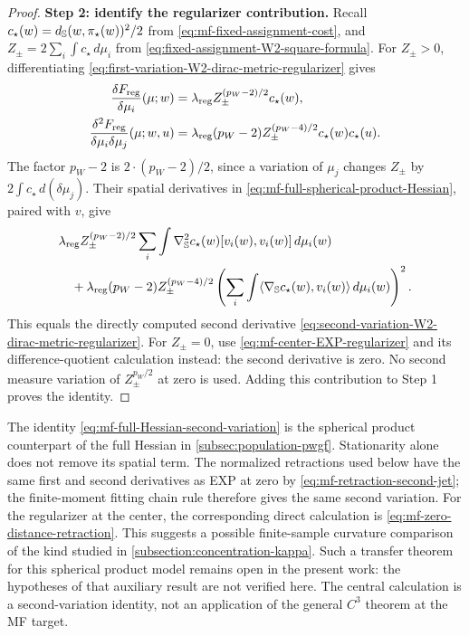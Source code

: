 \begin{proof}
\par\noindent\textbf{Step 2: identify the regularizer contribution.}
Recall
$c_\star(w)=d_{\mathbb{S}}(w,\pi_\star(w))^2/2$ from
\eqref{eq:mf-fixed-assignment-cost}, and
$Z_\pm=2\sum_i\int c_\star\,d\mu_i$ from
\eqref{eq:fixed-assignment-W2-square-formula}.
For $Z_\pm>0$, differentiating
\eqref{eq:first-variation-W2-dirac-metric-regularizer} gives
\[
\begin{aligned}
 \frac{\delta F_{\mathrm{reg}}}{\delta\mu_i}(\mu;w)
 &=\lambda_{\mathrm{reg}} Z_\pm^{(p_W-2)/2}c_\star(w),\\
 \frac{\delta^2F_{\mathrm{reg}}}{\delta\mu_i\delta\mu_j}(\mu;w,u)
 &=\lambda_{\mathrm{reg}}(p_W-2)Z_\pm^{(p_W-4)/2}c_\star(w)c_\star(u).
\end{aligned}
\]
The factor $p_W-2$ is $2\cdot(p_W-2)/2$, since a variation of
$\mu_j$ changes $Z_\pm$ by $2\int c_\star\,d(\delta\mu_j)$.
Their spatial derivatives in
\eqref{eq:mf-full-spherical-product-Hessian}, paired with $v$, give
\[
\begin{aligned}
 &\lambda_{\mathrm{reg}} Z_\pm^{(p_W-2)/2}
       \sum_i\int\nabla_{\mathbb{S}}^2c_\star(w)[v_i(w),v_i(w)]\,d\mu_i(w)\\
 &\quad+\lambda_{\mathrm{reg}}(p_W-2)Z_\pm^{(p_W-4)/2}
       \left(\sum_i\int\langle\nabla_{\mathbb{S}} c_\star(w),v_i(w)\rangle
                     \,d\mu_i(w)\right)^2.
\end{aligned}
\]
This equals the directly computed second derivative
\eqref{eq:second-variation-W2-dirac-metric-regularizer}.
For $Z_\pm=0$, use \eqref{eq:mf-center-EXP-regularizer} and its
difference-quotient calculation instead: the second derivative is zero.
No second measure variation of $Z_\pm^{p_W/2}$ at zero is used.
Adding this contribution to Step 1 proves the identity.
\end{proof}

\begin{remark}
The identity \eqref{eq:mf-full-Hessian-second-variation} is the spherical
product counterpart of the full Hessian in \cref{subsec:population-pwgf}.
Stationarity alone does not remove its spatial term.
The normalized retractions used below have the same first and second
derivatives as EXP at zero by \eqref{eq:mf-retraction-second-jet};
the finite-moment fitting chain rule therefore gives the same second
variation. For the regularizer at the center, the corresponding direct
calculation is \eqref{eq:mf-zero-distance-retraction}.
This suggests a possible finite-sample curvature comparison of the kind
studied in \cref{subsection:concentration-kappa}.
Such a transfer theorem for this spherical product model remains open
in the present work: the hypotheses of that auxiliary result are not
verified here. The central calculation is a second-variation identity,
not an application of the general $C^3$ theorem at the MF target.
\end{remark}
